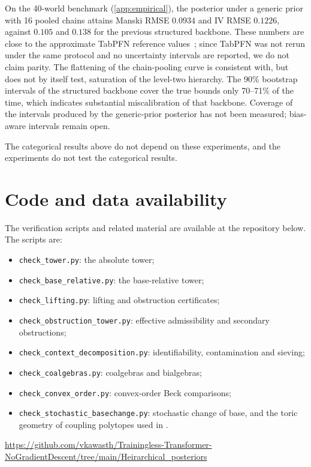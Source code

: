 \documentclass[11pt]{article}
\theoremstyle{definition}
\theoremstyle{remark}
\begin{document}
On the 40-world benchmark (\cref{app:empirical}), the posterior under a generic prior with 16 pooled
chains attains Manski RMSE $0.0934$ and IV RMSE $0.1226$, against $0.105$ and $0.138$ for the
previous structured backbone. These numbers are close to the approximate TabPFN reference
values~\cite{Hollmann2023}; since TabPFN was not rerun under the same protocol and no uncertainty
intervals are reported, we do not claim parity. The flattening of the chain-pooling curve is
consistent with, but does not by itself test, saturation of the level-two hierarchy. The 90\%
bootstrap intervals of the structured backbone cover the true bounds only 70--71\% of the time, which
indicates substantial miscalibration of that backbone. Coverage of the intervals produced by the
generic-prior posterior has not been measured; bias-aware intervals remain open.

The categorical results above do not depend on these experiments, and the experiments do not test
the categorical results.

\section{Code and data availability}

The verification scripts and related material are available at the repository below. The scripts
are:
\begin{itemize}[leftmargin=*,nosep]
\item \texttt{check\_tower.py}: the absolute tower;
\item \texttt{check\_base\_relative.py}: the base-relative tower;
\item \texttt{check\_lifting.py}: lifting and obstruction certificates;
\item \texttt{check\_obstruction\_tower.py}: effective admissibility and secondary obstructions;
\item \texttt{check\_context\_decomposition.py}: identifiability, contamination and sieving;
\item \texttt{check\_coalgebras.py}: coalgebras and bialgebras;
\item \texttt{check\_convex\_order.py}: convex-order Beck comparisons;
\item \texttt{check\_stochastic\_basechange.py}: stochastic change of base, and the toric geometry of
  coupling polytopes used in \cite{Awasthi-Attribution}.
\end{itemize}
\begin{center}\small\url{https://github.com/vkawasth/Trainingless-Transformer-NoGradientDescent/tree/main/Heirarchical_posteriors}\end{center}
\end{document}
